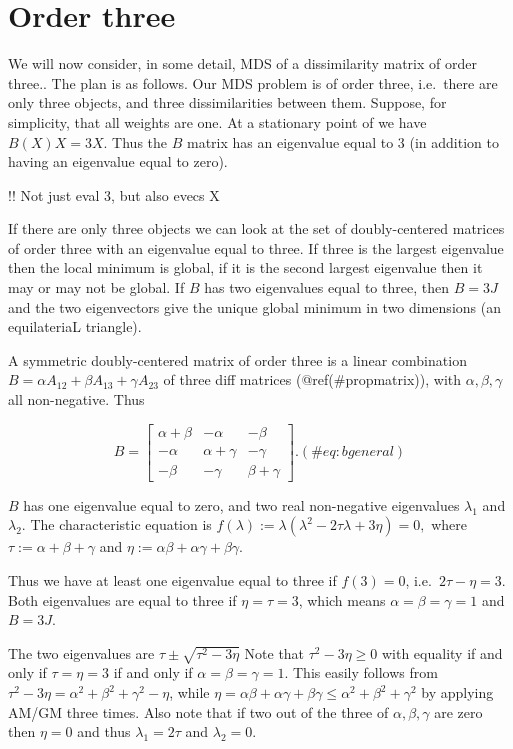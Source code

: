 \documentclass[
  12pt,
  letterpaper,
  DIV=11,
  numbers=noendperiod]{scrreprt}
\theoremstyle{remark}
\begin{document}
\section{Order three}\label{order-three}

We will now consider, in some detail, MDS of a dissimilarity matrix of
order three.. The plan is as follows. Our MDS problem is of order three,
i.e.~there are only three objects, and three dissimilarities between
them. Suppose, for simplicity, that all weights are one. At a stationary
point of we have \(B(X)X=3X\). Thus the \(B\) matrix has an eigenvalue
equal to \(3\) (in addition to having an eigenvalue equal to zero).

!! Not just eval 3, but also evecs X

If there are only three objects we can look at the set of
doubly-centered matrices of order three with an eigenvalue equal to
three. If three is the largest eigenvalue then the local minimum is
global, if it is the second largest eigenvalue then it may or may not be
global. If \(B\) has two eigenvalues equal to three, then \(B=3J\) and
the two eigenvectors give the unique global minimum in two dimensions
(an equilateriaL triangle).

A symmetric doubly-centered matrix of order three is a linear
combination \(B=\alpha A_{12}+\beta A_{13}+\gamma A_{23}\) of three diff
matrices (@ref(\#propmatrix)), with \(\alpha, \beta, \gamma\) all
non-negative. Thus

\begin{equation}
B=\begin{bmatrix}
\alpha+\beta&-\alpha&-\beta\\
-\alpha&\alpha+\gamma&-\gamma\\
-\beta&-\gamma&\beta+\gamma
\end{bmatrix}.
(\#eq:bgeneral)
\end{equation}

\(B\) has one eigenvalue equal to zero, and two real non-negative
eigenvalues \(\lambda_1\) and \(\lambda_2\). The characteristic equation
is \(f(\lambda):=\lambda(\lambda^2-2\tau\lambda+3\eta)=0,\) where
\(\tau:=\alpha+\beta+\gamma\) and
\(\eta:=\alpha\beta+\alpha\gamma+\beta\gamma.\)

Thus we have at least one eigenvalue equal to three if \(f(3)=0\),
i.e.~\(2\tau-\eta=3\). Both eigenvalues are equal to three if
\(\eta=\tau=3\), which means \(\alpha=\beta=\gamma=1\) and \(B=3J\).

The two eigenvalues are \(\tau\pm\sqrt{\tau^2-3\eta}\) Note that
\(\tau^2-3\eta\geq 0\) with equality if and only if \(\tau=\eta=3\) if
and only if \(\alpha=\beta=\gamma=1\). This easily follows from
\(\tau^2-3\eta=\alpha^2+\beta^2+\gamma^2-\eta\), while
\(\eta=\alpha\beta+\alpha\gamma+\beta\gamma\leq\alpha^2+\beta^2+\gamma^2\)
by applying AM/GM three times. Also note that if two out of the three of
\(\alpha,\beta,\gamma\) are zero then \(\eta=0\) and thus
\(\lambda_1=2\tau\) and \(\lambda_2=0\).
\end{document}

